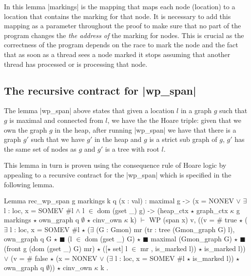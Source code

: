 \documentclass[nocopyrightspace]{sigplanconf}
\begin{document}
In this lemma \Coqe|markings| is the mapping that maps each node (location) to a location that contains the marking for that node.
It is necessary to add this mapping as a parameter throughout the
proof to make sure that no part of the program changes the
\emph{the address of} the marking for nodes.
This is crucial as the correctness of the program depends on the
race to mark the node and the fact that as soon as a thread sees
a node marked it stops assuming that another thread has processed or is
processing that node.

\subsection{The recursive contract for \Coqe|wp_span|}
The lemma \Coqe|wp_span| above states that given a location $l$ in a graph $g$
such that $g$ is maximal and connected from $l$, we have the the Hoare triple:
given that we own the graph $g$ in the heap, after running \Coqe|wp_span| we have
that there is a graph $g'$ such that we have $g'$ in the heap and $g$ is a strict sub graph of $g$, $g'$ has the same set of nodes as $g$ and $g'$ is a tree with root $l$.

This lemma in turn is proven using the consequence rule of Hoare logic 
by appealing to a recursive contract for the \Coqe|wp_span| which is
specified in the following lemma.

\begin{Coq}
Lemma rec_wp_span g markings k q (x : val) :
    maximal g ->
    (x = NONEV $\lor$ $\exists$ l : loc,
        x = SOMEV $\#$l $\land$ l $\in$ dom (gset _) g) ->
    (heap_ctx $\star$ graph_ctx $\kappa$ g markings $\star$ own_graph q $\emptyset$ $\star$ cinv_own $\kappa$ k)
      $\vdash$
      WP (span x)
      {{ v, ((v = $\#$ true $\star$
             ($\exists$ l : loc, x = SOMEV $\#$l $\star$
               ($\exists$ (G : Gmon) mr (tr : tree (Gmon_graph G) l),
                  own_graph q G $\star$ $\scriptscriptstyle\blacksquare$ (l $\in$ dom (gset _) G) $\star$
                  $\scriptscriptstyle\blacksquare$ maximal (Gmon_graph G) $\star$
                  $\scriptscriptstyle\blacksquare$ (front g (dom (gset _) G) mr) $\star$
                   ([$\star$ set] l $\in$ mr , is_marked l)) $\star$ is_marked l)) $\lor$
             (v = $\#$ false $\star$
              (x = NONEV $\lor$ ($\exists$ l : loc, x = SOMEV $\#$l $\star$ is_marked l))
               $\star$ own_graph q $\emptyset$))
            $\star$ cinv_own $\kappa$ k }}.
\end{Coq}
\end{document}
